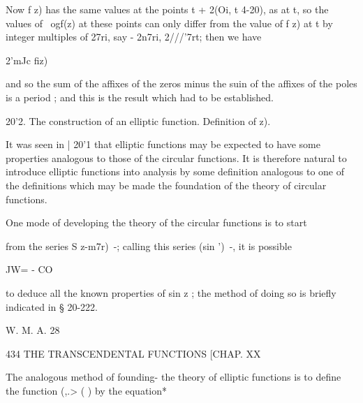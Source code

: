 Now f z) has the same values at the points t + 2(Oi, t 4-20), as at t,
so the values of \ ogf(z) at these points can only differ from the
value of f z) at t by integer multiples of 27ri, say - 2n7ri,
2///'7rt; then we have

2'mJc fiz)

and so the sum of the affixes of the zeros minus the suin of the
affixes of the poles is a period ; and this is the result which had to
be established.

20'2. The construction of an elliptic function. Definition of z).

It was seen in | 20'1 that elliptic functions may be expected to have
some properties analogous to those of the circular functions. It is
therefore natural to introduce elliptic functions into analysis by
some definition analogous to one of the definitions which may be made
the foundation of the theory of circular functions.

One mode of developing the theory of the circular functions is to
start

from the series S z-m7r)~-; calling this series (sin ')~-, it is
possible

JW= - CO

to deduce all the known properties of sin z ; the method of doing so
is briefly indicated in § 20-222.

W. M. A. 28



434 THE TRANSCENDENTAL FUNCTIONS [CHAP. XX

The analogous method of founding- the theory of elliptic functions is
to define the function (,.> ( ) by the equation*

